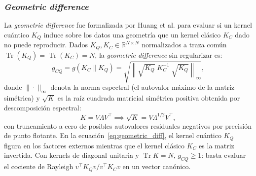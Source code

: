 
\subsubsection{\textit{Geometric difference}}

La \textit{geometric difference} fue formalizada por Huang et al. \cite{huang2021power}
para evaluar si un kernel cuántico $K_Q$ induce sobre los datos una geometría que un kernel
clásico $K_C$ dado no puede reproducir.
Dados $K_Q, K_C \in \mathbb{R}^{N \times N}$ normalizados a traza común $\operatorname{Tr}(K_Q) = \operatorname{Tr}(K_C) = N$,
la \textit{geometric difference} sin regularizar es:
\begin{equation}
  g_{CQ} = g(K_C \parallel K_Q) = \sqrt{\left\| \sqrt{K_Q}\;K_C^{-1}\;\sqrt{K_Q} \right\|_\infty},
  \label{eq:geometric_diff}
\end{equation}
donde $\|\cdot\|_\infty$ denota la norma espectral (el autovalor máximo de la matriz simétrica)
y $\sqrt{K}$ es la raíz cuadrada matricial simétrica positiva obtenida por descomposición
espectral:
\begin{equation}
  K = V \Lambda V^\top \implies \sqrt{K} = V \Lambda^{1/2} V^\top,
  \label{eq:spectral_sqrt}
\end{equation}
con truncamiento a cero de posibles autovalores residuales negativos por precisión de punto
flotante. En la ecuación~\eqref{eq:geometric_diff}, el kernel cuántico $K_Q$ figura en los
factores externos mientras que el kernel clásico $K_C$ es la matriz invertida.
Con kernels de diagonal unitaria y $\operatorname{Tr}K=N$, $g_{CQ}\ge1$: basta evaluar el cociente de Rayleigh $v^\top K_Q v / v^\top K_C v$ en un vector canónico.

